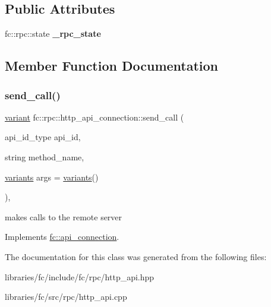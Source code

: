 \subsection*{Public Attributes}
\begin{DoxyCompactItemize}
\item 
\mbox{\label{classfc_1_1rpc_1_1http__api__connection_a56b36afdcec3344f78d344b4636ca96c}} 
fc\+::rpc\+::state {\bfseries \+\_\+rpc\+\_\+state}
\end{DoxyCompactItemize}


\subsection{Member Function Documentation}
\mbox{\label{classfc_1_1rpc_1_1http__api__connection_a3f613b413f6792e3aa631d8e20f4f2c9}} 
\subsubsection{\texorpdfstring{send\+\_\+call()}{send\_call()}}
{\footnotesize\ttfamily \mbox{\hyperlink{classfc_1_1variant}{variant}} fc\+::rpc\+::http\+\_\+api\+\_\+connection\+::send\+\_\+call (\begin{DoxyParamCaption}\item[{api\+\_\+id\+\_\+type}]{api\+\_\+id,  }\item[{string}]{method\+\_\+name,  }\item[{\mbox{\hyperlink{classstd_1_1vector}{variants}}}]{args = {\ttfamily \mbox{\hyperlink{classstd_1_1vector}{variants}}()} }\end{DoxyParamCaption})\hspace{0.3cm}{\ttfamily [override]}, {\ttfamily [virtual]}}

makes calls to the remote server 

Implements \mbox{\hyperlink{classfc_1_1api__connection_a38d046b1803e1242ce10f36c694b9dea}{fc\+::api\+\_\+connection}}.



The documentation for this class was generated from the following files\+:\begin{DoxyCompactItemize}
\item 
libraries/fc/include/fc/rpc/http\+\_\+api.\+hpp\item 
libraries/fc/src/rpc/http\+\_\+api.\+cpp\end{DoxyCompactItemize}
